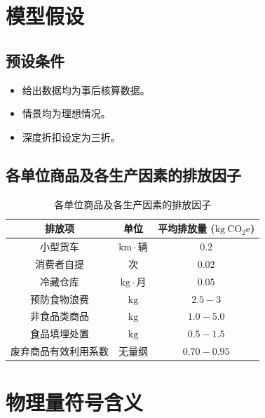 \documentclass{article}
\begin{document}
\section{模型假设}

\subsection{预设条件}
\begin{itemize}
    \item 给出数据均为事后核算数据。
    \item 情景均为理想情况。
    \item 深度折扣设定为三折。
\end{itemize}


\subsection{各单位商品及各生产因素的排放因子}

\begin{table}[htbp]
\centering
\caption{各单位商品及各生产因素的排放因子}
\begin{tabular}{|c|c|c|}
\hline 排放项 & 单位 & 平均排放量 ($\mathrm{kg\ CO_2e}$) \\
\hline 小型货车 & $\mathrm{km} \cdot$辆 & $0.2$ \\
\hline 消费者自提 & 次 & $0.02$ \\
\hline 冷藏仓库 & $\mathrm{kg} \cdot$月 & $0.05$ \\
\hline 预防食物浪费 & $\mathrm{kg}$ & $2.5-3$ \\
\hline 非食品类商品 & $\mathrm{kg}$ & $1.0-5.0$ \\
\hline 食品填埋处置 & $\mathrm{kg}$ & $0.5-1.5$ \\
\hline 废弃商品有效利用系数 & 无量纲& $0.70-0.95$ \\
\hline
\end{tabular}
\label{tab:emission_factors}
\end{table}

\section{物理量符号含义}%
\end{document}

